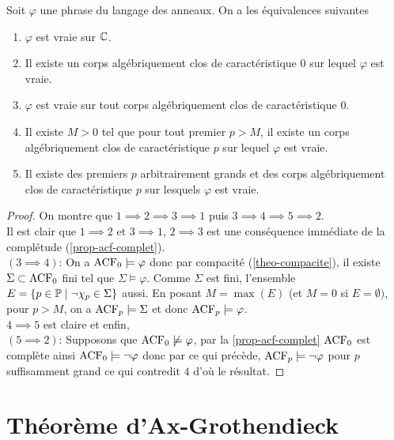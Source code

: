 \begin{coro}\label{coro-Lefschetz}
    Soit $\varphi$ une phrase du langage des anneaux. On a les
    équivalences suivantes

    \begin{enumerate}[label= (\roman*)]
        \item $\varphi$ est vraie sur  $\mathbb{C}$.
        \item Il existe un corps algébriquement clos de caractéristique $0$ sur
        lequel $\varphi$ est vraie.
        \item $\varphi$ est vraie sur tout corps algébriquement clos de
        caractéristique $0$.
        \item Il existe $M>0$ tel que pour tout premier $p>M$, il existe un
        corps algébriquement clos de caractéristique $p$ sur lequel $\varphi$
        est vraie.
        \item Il existe des premiers $p$ arbitrairement grands et des corps
        algébriquement clos de caractéristique $p$ sur lesquels $\varphi$ est
        vraie.
    \end{enumerate}

\end{coro}

\begin{proof}
On montre que $1 \implies 2 \implies 3 \implies 1$ puis $3 \implies
4 \implies 5 \implies 2$. \\
Il est clair que $1 \implies 2$ et  $3 \implies 1$, $2 \implies 3$
est une conséquence immédiate de la complétude (\cref{prop-acf-complet}).\\
$(3 \implies 4)$: On a $\operatorname{ACF}_0 \models \varphi$ donc par compacité
(\cref{theo-compacite}), il existe $\Sigma \subset \operatorname{ACF}_0$ fini tel que $\Sigma
\models \varphi$. Comme $\Sigma$ est fini, l'ensemble $E= \{ p \in \mathbb{P} \mid \neg
\chi_p \in \Sigma \}$ aussi. En posant $M = \max(E)$ (et $M=0$ si $E = \emptyset)$,
pour $p > M$, on a $ \operatorname{ACF}_p \models \Sigma$ et donc $\operatorname{ACF}_p \models \varphi$. \\
$4 \implies 5$ est claire et enfin, \\
$(5 \implies 2)$: Supposons que $\operatorname{ACF}_0 \not\models \varphi$,
par la \cref{prop-acf-complet} $\operatorname{ACF}_0$ est complète ainsi $\operatorname{ACF}_0 \models \neg
\varphi$ donc par ce qui précède, $\operatorname{ACF}_p \models \neg\varphi$ pour $p$
suffisamment grand ce qui contredit $4$ d'où le résultat.
\end{proof}

\section{Théorème d'Ax-Grothendieck}

